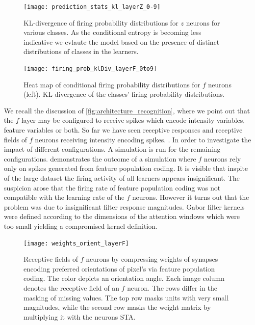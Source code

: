 \documentclass{report}
\begin{document}
\begin{figure}[ht]
\centering
\texttt{[image: prediction\_stats\_kl\_layerZ\_0-9]}
\caption{KL-divergence of firing probability distributions for $z$ neurons for various classes. As the conditional entropy is becoming less indicative we evlaute the model based on the presence of distinct distributions of classes in the learners.
\label{fig:prediction_stats_kl_layerZ_0-9}}
\end{figure}

\begin{figure}[ht]
\centering
\texttt{[image: firing\_prob\_klDiv\_layerF\_0to9]}
\caption{Heat map of conditional firing probability distributions for $f$ neurons (left). KL-divergence of the classes' firing probability distributions.
\label{fig:firing_prob_klDiv_layerF_0to9}}
\end{figure}

We recall the discussion of \cref{fig:architecture_recognition}, where we point out that the $f$ layer may be configured to receive spikes which encode intensity variables, feature variables or both. So far we have seen receptive responses and receptive fields of $f$ neurons receiving intensity encoding spikes. . In order to investigate the impact of different configurations. A simulation is run for the remaining configurations.  demonstrates the outcome of a simulation where $f$ neurons rely only on spikes generated from feature population coding. It is visible that inspite of the large dataset the firing activity of all learners appears insignificant. The suspicion arose that the firing rate of feature population coding was not compatible with the learning rate of the $f$ neurons. However it turns out that the problem was due to insignificant filter response magnitudes. Gabor filter kernels were defined according to the dimensions of the attention windows which were too small yielding a compromised kernel definition.

\begin{figure}[ht]
\centering
\texttt{[image: weights\_orient\_layerF]}
\caption{Receptive fields of $f$ neurons by compressing weights of synapses encoding preferred orientations of pixel's via feature population coding. The color depicts an orientation angle. Each image column denotes the receptive field of an $f$ neuron. The rows differ in the masking of missing values. The top row masks units with very small magnitudes, while the second row masks the weight matrix by multiplying it with the neurons STA.
\label{fig:weights_orient_layerF}}
\end{figure}
\end{document}
